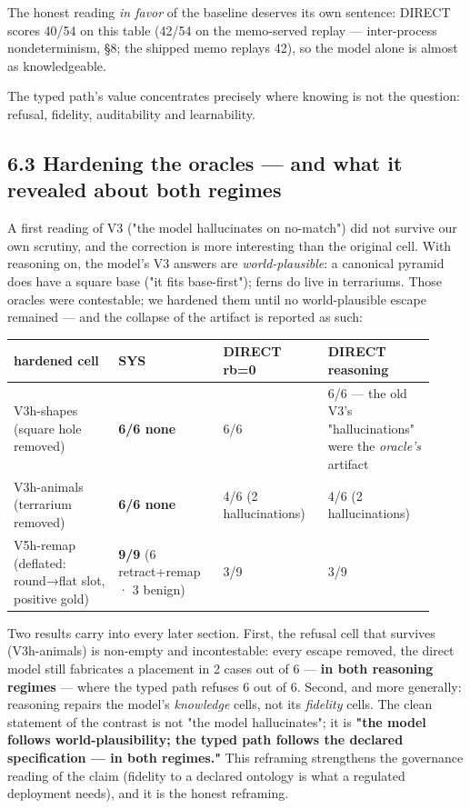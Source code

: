 \documentclass[11pt]{article}
\begin{document}
The honest reading \emph{in favor} of the baseline deserves its own sentence: DIRECT scores 40/54 on this table (42/54 on the memo-served replay — inter-process nondeterminism, §8; the shipped memo replays 42), so the model alone is almost as knowledgeable.

The typed path's value concentrates precisely where knowing is not the question: refusal, fidelity, auditability and learnability.

\subsection*{6.3 Hardening the oracles — and what it revealed about both regimes}

A first reading of V3 ("the model hallucinates on no-match") did not survive our own scrutiny, and the correction is more interesting than the original cell. With reasoning on, the model's V3 answers are \emph{world-plausible}: a canonical pyramid does have a square base ("it fits base-first"); ferns do live in terrariums. Those oracles were contestable; we hardened them until no world-plausible escape remained — and the collapse of the artifact is reported as such:

\begin{center}\small\begin{tabular}{p{0.23\linewidth}p{0.23\linewidth}p{0.23\linewidth}p{0.23\linewidth}}\toprule
hardened cell & SYS & DIRECT rb=0 & DIRECT reasoning \\ \midrule
V3h-shapes (square hole removed) & \textbf{6/6 none} & 6/6 & 6/6 — the old V3's "hallucinations" were the \emph{oracle's} artifact \\
V3h-animals (terrarium removed) & \textbf{6/6 none} & 4/6 (2 hallucinations) & 4/6 (2 hallucinations) \\
V5h-remap (deflated: round→flat slot, positive gold) & \textbf{9/9} (6 retract+remap · 3 benign) & 3/9 & 3/9 \\
\bottomrule\end{tabular}\end{center}

Two results carry into every later section. First, the refusal cell that survives (V3h-animals) is non-empty and incontestable: every escape removed, the direct model still fabricates a placement in 2 cases out of 6 — \textbf{in both reasoning regimes} — where the typed path refuses 6 out of 6. Second, and more generally: reasoning repairs the model's \emph{knowledge} cells, not its \emph{fidelity} cells. The clean statement of the contrast is not "the model hallucinates"; it is \textbf{"the model follows world-plausibility; the typed path follows the declared specification — in both regimes."} This reframing strengthens the governance reading of the claim (fidelity to a declared ontology is what a regulated deployment needs), and it is the honest reframing.
\end{document}
